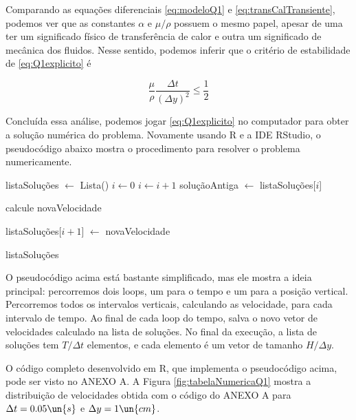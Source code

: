 Comparando as equações diferenciais \eqref{eq:modeloQ1} e \eqref{eq:transCalTransiente},
podemos ver que as constantes $\alpha$ e $\mu / \rho$ possuem o mesmo papel, apesar de uma
ter um significado físico de transferência de calor e outra um significado de mecânica dos fluidos.
Nesse sentido, podemos inferir que o critério de estabilidade de \eqref{eq:Q1explicito} é

\begin{equation}\label{eq:Q1estabilidade}
    \frac{\mu}{\rho} \frac{\Delta t}{\left(\Delta y\right)^2} \leq \frac{1}{2}
\end{equation}

Concluída essa análise, podemos jogar \eqref{eq:Q1explicito} no computador para obter a solução
numérica do problema. Novamente usando R e a IDE RStudio, o pseudocódigo abaixo mostra
o procedimento para resolver o problema numericamente.

\begin{algorithmic}
    \State listaSoluções $\gets$ Lista()
    \State $i \gets 0$
        \State $i \gets i + 1$
        \State soluçãoAntiga $\gets$ listaSoluções[$i$]

            \State calcule novaVelocidade
        \EndFor

        \State listaSoluções[$i + 1$] $\gets$ novaVelocidade
    \EndFor

    \Return listaSoluções
\end{algorithmic}

O pseudocódigo acima está bastante simplificado, mas ele mostra a ideia principal: percorremos 
dois loops, um para o tempo e um para a posição vertical. Percorremos todos os intervalos verticais,
calculando as velocidade, para cada intervalo de tempo. Ao final de cada loop do tempo, salva o novo
vetor de velocidades calculado na lista de soluções. No final da execução, a lista de soluções 
tem $T / \Delta t$ elementos, e cada elemento é um vetor de tamanho $H / \Delta y$.

O código completo desenvolvido em R, que implementa o pseudocódigo acima,
pode ser visto no ANEXO A. A Figura \ref*{fig:tabelaNumericaQ1} mostra a distribuição de 
velocidades obtida com o código do ANEXO A para $\Delta t = 0.05 \un{s}$ e $\Delta y = 1 \un{cm}$.

